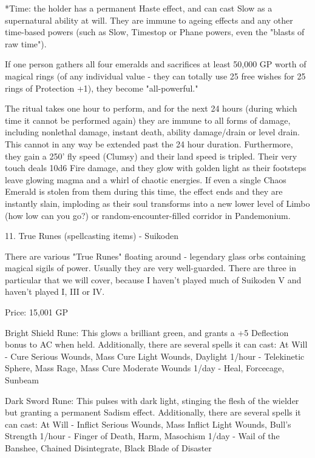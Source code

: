 \begin{multicols}{2}
*Time: the holder has a permanent Haste effect, and can cast Slow as a supernatural ability at will. They are immune to ageing effects and any other time-based powers (such as Slow, Timestop or Phane powers, even the "blasts of raw time").

If one person gathers all four emeralds and sacrifices at least 50,000 GP worth of magical rings (of any individual value - they can totally use 25 free wishes for 25 rings of Protection +1), they become "all-powerful."

The ritual takes one hour to perform, and for the next 24 hours (during which time it cannot be performed again) they are immune to all forms of damage, including nonlethal damage, instant death, ability damage/drain or level drain. This cannot in any way be extended past the 24 hour duration. Furthermore, they gain a 250' fly speed (Clumsy) and their land speed is tripled. Their very touch deals 10d6 Fire damage, and they glow with golden light as their footsteps leave glowing magma and a whirl of chaotic energies. If even a single Chaos Emerald is stolen from them during this time, the effect ends and they are instantly slain, imploding as their soul transforms into a new lower level of Limbo (how low can you go?) or random-encounter-filled corridor in Pandemonium. 



11. True Runes (spellcasting items) - Suikoden

There are various "True Runes" floating around - legendary glass orbs containing magical sigils of power. Usually they are very well-guarded. There are three in particular that we will cover, because I haven't played much of Suikoden V and haven't played I, III or IV.

Price: 15,001 GP

Bright Shield Rune: This glows a brilliant green, and grants a +5 Deflection bonus to AC when held. Additionally, there are several spells it can cast:
At Will - Cure Serious Wounds, Mass Cure Light Wounds, Daylight
1/hour - Telekinetic Sphere, Mass Rage, Mass Cure Moderate Wounds
1/day - Heal, Forcecage, Sunbeam

Dark Sword Rune: This pulses with dark light, stinging the flesh of the wielder but granting a permanent Sadism effect. Additionally, there are several spells it can cast:
At Will - Inflict Serious Wounds, Mass Inflict Light Wounds, Bull's Strength
1/hour - Finger of Death, Harm, Masochism
1/day - Wail of the Banshee, Chained Disintegrate, Black Blade of Disaster


\end{multicols}
